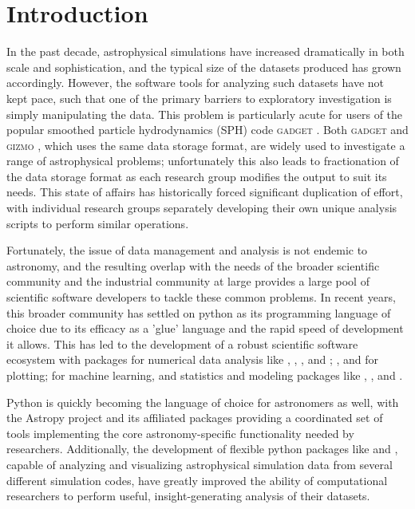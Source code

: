 \section{Introduction}
\label{sec:intro}

In the past decade, astrophysical simulations have increased dramatically in both scale and sophistication, and the typical size of the datasets produced has grown accordingly.  
However, the software tools for analyzing such datasets have not kept pace, such that one of the primary barriers to exploratory investigation is simply manipulating the data.  
This problem is particularly acute for users of the popular smoothed particle hydrodynamics (SPH) code \textsc{gadget} \citep{SpringelYoshidaWhite2001,Springel2005}.  
Both \textsc{gadget} and \textsc{gizmo} \citep{Hopkins2015}, which uses the same data storage format, are widely used to investigate a range of astrophysical problems; unfortunately this also leads to fractionation of the data storage format as each research group modifies the output to suit its needs.
This state of affairs has historically forced significant duplication of effort, with individual research groups separately developing their own unique analysis scripts to perform similar operations.

Fortunately, the issue of data management and analysis is not endemic to astronomy, and the resulting overlap with the needs of the broader scientific community and the industrial community at large provides a large pool of scientific software developers to tackle these common problems.
In recent years, this broader community has settled on python as its programming language of choice due to its efficacy as a 'glue' language and the rapid speed of development it allows.  
This has led to the development of a robust scientific software ecosystem with packages for numerical data analysis like  \citep{Oliphant2006,VanderWaltColbertVaroquaux2011},  \citep{JonesOliphantPeterson2001},  \citep{McKinney2012}, and ;  \citep{Hunter2007}, and  for plotting;  for machine learning, and statistics and modeling packages like , , and  \citep{Foreman-Mackeyetal2013}.

Python is quickly becoming the language of choice for astronomers as well, with the Astropy project \citep{Robitailleetal2013} and its affiliated packages providing a coordinated set of tools implementing the core astronomy-specific functionality needed by researchers. 
Additionally, the development of flexible python packages like  \citep{Turketal2011} and  \citep{Pontzenetal2013}, capable of analyzing and visualizing astrophysical simulation data from several different simulation codes, have greatly improved the ability of computational researchers to perform useful, insight-generating analysis of their datasets.

